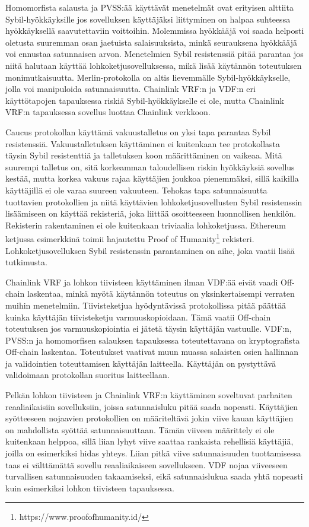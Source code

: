 Homomorfista salausta ja PVSS:ää käyttävät menetelmät ovat erityisen alttiita Sybil-hyökkäyksille jos sovelluksen käyttäjäksi liittyminen on halpaa suhteessa hyökkäyksellä saavutettaviin voittoihin. Molemmissa hyökkääjä voi saada helposti oletusta suuremman osan jaetuista salaisuuksista, minkä seurauksena hyökkääjä voi ennustaa satunnaisen arvon. Menetelmien Sybil resistenssiä pitää parantaa jos niitä halutaan käyttää lohkoketjusovelluksessa, mikä lisää käytännön toteutuksen monimutkaisuutta. Merlin-protokolla on altis lievemmälle Sybil-hyökkäykselle, jolla voi manipuloida satunnaisuutta. Chainlink VRF:n ja VDF:n eri käyttötapojen tapauksessa riskiä Sybil-hyökkäykselle ei ole, mutta Chainlink VRF:n tapauksessa sovellus luottaa Chainlink verkkoon.

Caucus protokollan käyttämä vakuustalletus on yksi tapa parantaa Sybil resistenssiä. Vakuustalletuksen käyttäminen ei kuitenkaan tee protokollasta täysin Sybil resistenttiä ja talletuksen koon määrittäminen on vaikeaa. Mitä suurempi talletus on, sitä korkeamman taloudellisen riskin hyökkäyksiä sovellus kestää, mutta korkea vakuus rajaa käyttäjien joukkoa pienemmäksi, sillä kaikilla käyttäjillä ei ole varaa suureen vakuuteen. Tehokas tapa satunnaisuutta tuottavien protokollien ja niitä käyttävien lohkoketjusovellusten Sybil resistenssin lisäämiseen on käyttää rekisteriä, joka liittää osoitteeseen luonnollisen henkilön. Rekisterin rakentaminen ei ole kuitenkaan triviaalia lohkoketjussa. Ethereum ketjussa esimerkkinä toimii hajautettu Proof of Humanity\footnote{https://www.proofofhumanity.id/} rekisteri. Lohkoketjusovelluksen Sybil resistenssin parantaminen on aihe, joka vaatii lisää tutkimusta.

Chainlink VRF ja lohkon tiivisteen käyttäminen ilman VDF:ää eivät vaadi Off-chain laskentaa, minkä myötä käytännön toteutus on yksinkertaisempi verraten muihin menetelmiin. Tiivisteketjua hyödyntävissä protokollissa pitää päättää kuinka käyttäjän tiivisteketju varmuuskopioidaan. Tämä vaatii Off-chain toteutuksen jos varmuuskopiointia ei jätetä täysin käyttäjän vastuulle. VDF:n, PVSS:n ja homomorfisen salauksen tapauksessa toteutettavana on kryptografista Off-chain laskentaa. Toteutukset vaativat muun muassa salaisten osien hallinnan ja validointien toteuttamisen käyttäjän laitteella. Käyttäjän on pystyttävä validoimaan protokollan suoritus laitteellaan.

Pelkän lohkon tiivisteen ja Chainlink VRF:n käyttäminen soveltuvat parhaiten reaaliaikaisiin sovelluksiin, joissa satunnaisluku pitää saada nopeasti. Käyttäjien syötteeseen nojaavien protokollien on määriteltävä jokin viive kauan käyttäjien on mahdollista syöttää satunnaisuuttaan. Tämän viiveen määrittely ei ole kuitenkaan helppoa, sillä liian lyhyt viive saattaa rankaista rehellisiä käyttäjiä, joilla on esimerkiksi hidas yhteys. Liian pitkä viive satunnaisuuden tuottamisessa taas ei välttämättä sovellu reaaliaikaiseen sovellukseen. VDF nojaa viiveeseen turvallisen satunnaisuuden takaamiseksi, eikä satunnaislukua saada yhtä nopeasti kuin esimerkiksi lohkon tiivisteen tapauksessa. 

